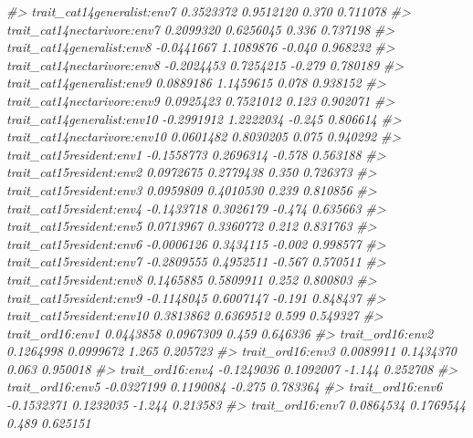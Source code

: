\documentclass[
]{article}
\newenvironment{Shaded}{\begin{snugshade}}{\end{snugshade}}
\newcommand{\CommentTok}[1]{\textcolor[rgb]{0.56,0.35,0.01}{\textit{#1}}}
\begin{document}
\begin{Shaded}
\begin{Highlighting}[]
\CommentTok{\#\textgreater{} trait\_cat14generalist:env7     0.3523372  0.9512120   0.370 0.711078    }
\CommentTok{\#\textgreater{} trait\_cat14nectarivore:env7    0.2099320  0.6256045   0.336 0.737198    }
\CommentTok{\#\textgreater{} trait\_cat14generalist:env8    {-}0.0441667  1.1089876  {-}0.040 0.968232    }
\CommentTok{\#\textgreater{} trait\_cat14nectarivore:env8   {-}0.2024453  0.7254215  {-}0.279 0.780189    }
\CommentTok{\#\textgreater{} trait\_cat14generalist:env9     0.0889186  1.1459615   0.078 0.938152    }
\CommentTok{\#\textgreater{} trait\_cat14nectarivore:env9    0.0925423  0.7521012   0.123 0.902071    }
\CommentTok{\#\textgreater{} trait\_cat14generalist:env10   {-}0.2991912  1.2222034  {-}0.245 0.806614    }
\CommentTok{\#\textgreater{} trait\_cat14nectarivore:env10   0.0601482  0.8030205   0.075 0.940292    }
\CommentTok{\#\textgreater{} trait\_cat15resident:env1      {-}0.1558773  0.2696314  {-}0.578 0.563188    }
\CommentTok{\#\textgreater{} trait\_cat15resident:env2       0.0972675  0.2779438   0.350 0.726373    }
\CommentTok{\#\textgreater{} trait\_cat15resident:env3       0.0959809  0.4010530   0.239 0.810856    }
\CommentTok{\#\textgreater{} trait\_cat15resident:env4      {-}0.1433718  0.3026179  {-}0.474 0.635663    }
\CommentTok{\#\textgreater{} trait\_cat15resident:env5       0.0713967  0.3360772   0.212 0.831763    }
\CommentTok{\#\textgreater{} trait\_cat15resident:env6      {-}0.0006126  0.3434115  {-}0.002 0.998577    }
\CommentTok{\#\textgreater{} trait\_cat15resident:env7      {-}0.2809555  0.4952511  {-}0.567 0.570511    }
\CommentTok{\#\textgreater{} trait\_cat15resident:env8       0.1465885  0.5809911   0.252 0.800803    }
\CommentTok{\#\textgreater{} trait\_cat15resident:env9      {-}0.1148045  0.6007147  {-}0.191 0.848437    }
\CommentTok{\#\textgreater{} trait\_cat15resident:env10      0.3813862  0.6369512   0.599 0.549327    }
\CommentTok{\#\textgreater{} trait\_ord16:env1               0.0443858  0.0967309   0.459 0.646336    }
\CommentTok{\#\textgreater{} trait\_ord16:env2               0.1264998  0.0999672   1.265 0.205723    }
\CommentTok{\#\textgreater{} trait\_ord16:env3               0.0089911  0.1434370   0.063 0.950018    }
\CommentTok{\#\textgreater{} trait\_ord16:env4              {-}0.1249036  0.1092007  {-}1.144 0.252708    }
\CommentTok{\#\textgreater{} trait\_ord16:env5              {-}0.0327199  0.1190084  {-}0.275 0.783364    }
\CommentTok{\#\textgreater{} trait\_ord16:env6              {-}0.1532371  0.1232035  {-}1.244 0.213583    }
\CommentTok{\#\textgreater{} trait\_ord16:env7               0.0864534  0.1769544   0.489 0.625151    }

\end{Highlighting}
\end{Shaded}
\end{document}
